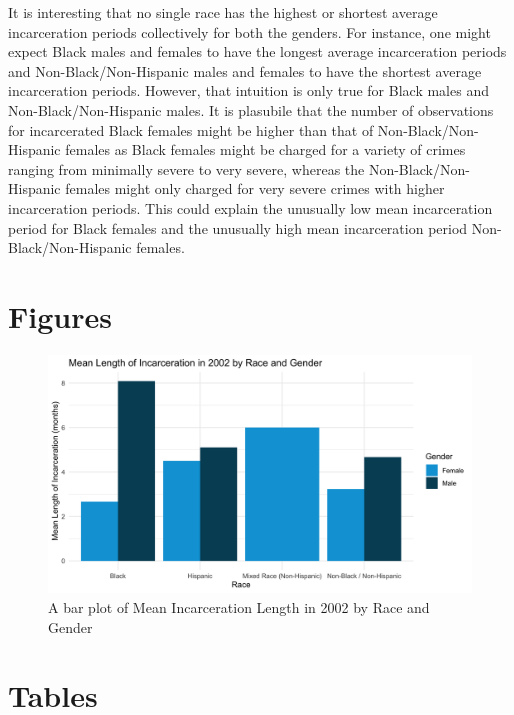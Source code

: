 \documentclass{article}
\begin{document}
It is interesting that no single race has the highest or shortest average incarceration periods collectively for both the genders.
For instance, one might expect Black males and females to have the longest average incarceration periods and Non-Black/Non-Hispanic males and females to have the shortest average incarceration periods. However, that intuition is only true for Black males and 
Non-Black/Non-Hispanic males. It is plasubile that the number of observations for incarcerated Black females might be higher than that of
Non-Black/Non-Hispanic females as Black females might be charged for a variety of crimes ranging from minimally severe to very severe, whereas the Non-Black/Non-Hispanic females might only charged for very severe crimes with higher incarceration periods. 
This could explain the unusually low mean incarceration period for Black females and the unusually high mean incarceration period 
Non-Black/Non-Hispanic females. 




\section{Figures}

\begin{figure}[H]
    \begin{center}
        \includegraphics[width=.85\textwidth]{incar_length_by_racegender}
    \end{center}
    \caption{A bar plot of Mean Incarceration Length in 2002 by Race and Gender}
    \label{fig:graph}
\end{figure}

\section{Tables}




\end{document}

